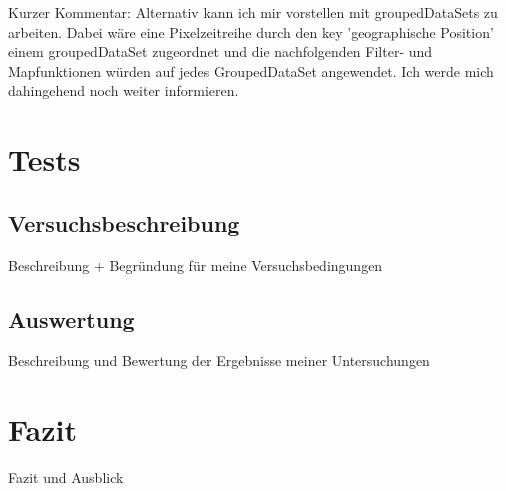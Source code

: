 
Kurzer Kommentar:
Alternativ kann ich mir vorstellen mit groupedDataSets zu arbeiten. Dabei wäre eine Pixelzeitreihe durch den key 'geographische Position' einem groupedDataSet zugeordnet und die nachfolgenden Filter- und Mapfunktionen würden auf jedes GroupedDataSet angewendet. Ich werde mich dahingehend noch weiter informieren. 

\chapter{Tests}
\section{Versuchsbeschreibung}
Beschreibung + Begründung für meine Versuchsbedingungen
\section{Auswertung}
Beschreibung und Bewertung der Ergebnisse meiner Untersuchungen

\chapter{Fazit}
Fazit und Ausblick

